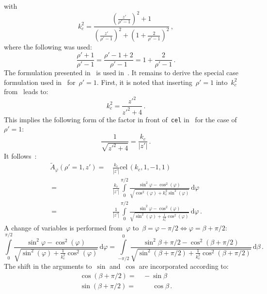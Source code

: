 with
\begin{equation}
  k_c^2 =
  \frac{\left(\frac{z'}{\rho'-1}\right)^2 + 1}
       {\left(\frac{z'}{\rho'-1}\right)^2 + \left(1 + \frac{2}{\rho'-1}\right)^2} \, ,
\end{equation}
where the following was used:
\begin{equation}
    \frac{\rho' + 1}{\rho' - 1}
  = \frac{\rho'-1 + 2}{\rho' - 1}
  = 1 + \frac{2}{\rho' - 1} \, .
\end{equation}
The formulation presented in~ is used in~.
It remains to derive the special case formulation used in~ for~$\rho'=1$.
First, it is noted that inserting~$\rho'=1$ into~$k_c^2$ from~ leads to:
\begin{equation}
  k_c^2 = \frac{z'^2}{z'^2 + 4} \, .
\end{equation}
This implies the following form of the factor in front of~\texttt{cel} in~
for the case of~$\rho'=1$:
\begin{equation}
  \frac{1}{\sqrt{z'^2 + 4}} = \frac{k_c}{|z'|} \, .
\end{equation}
It follows~\cite{bulirsch_3}:
\begin{align}
  \tilde{A}_\varphi(\rho'=1,z') =&\, \frac{k_c}{|z'|} \textrm{cel}\,(k_c, 1, -1, 1) \nonumber \\
  ~ =&\, \frac{k_c}{|z'|} \int\limits_0^{\pi/2} \frac{\sin^2{\varphi} - \cos^2(\varphi)}{\sqrt{\cos^2(\varphi) + k_c^2 \sin^2(\varphi)}} \,\mathrm{d}\varphi \nonumber \\
  ~ =&\,   \frac{1}{|z'|} \int\limits_0^{\pi/2} \frac{\sin^2{\varphi} - \cos^2(\varphi)}{\sqrt{\sin^2(\varphi) + \frac{1}{k_c^2} \cos^2(\varphi)}} \,\mathrm{d}\varphi \, .
\end{align}
A change of variables is performed from~$\varphi$ to~$\beta = \varphi - \pi/2 \Leftrightarrow \varphi = \beta + \pi/2$:
\begin{equation}
   \int\limits_0^{\pi/2} \frac{\sin^2{\varphi} - \cos^2(\varphi)}{\sqrt{\sin^2(\varphi) + \frac{1}{k_c^2} \cos^2(\varphi)}} \,\mathrm{d}\varphi
 = \int\limits_{-\pi/2}^{0} \frac{\sin^2{\beta + \pi/2} - \cos^2(\beta + \pi/2)}{\sqrt{\sin^2(\beta + \pi/2) + \frac{1}{k_c^2} \cos^2(\beta + \pi/2)}} \,\mathrm{d}\beta \, .
\end{equation}
The shift in the arguments to~$\sin$ and~$\cos$ are incorporated according to:
\begin{align}
  \cos(\beta + \pi/2) =&\,          -    \sin{\beta} \\
  \sin(\beta + \pi/2) =&\, \phantom{-}\, \cos{\beta} \, .
\end{align}
